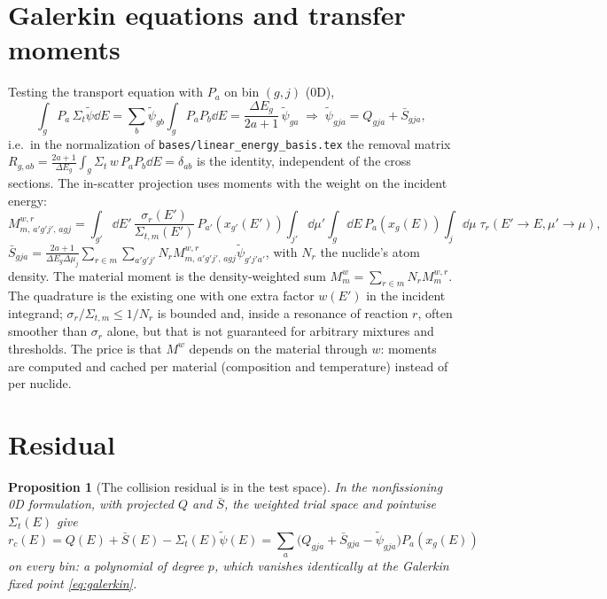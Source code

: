 \documentclass[11pt]{article}
\newtheorem{proposition}{Proposition}
\newcommand{\tpsi}{\tilde\psi}
\newcommand{\Sbar}{\bar S}
\newcommand{\Sigt}{\Sigma_t}
\begin{document}
\section{Galerkin equations and transfer moments}

Testing the transport equation with $P_a$ on bin $(g,j)$ (0D),
\begin{equation}
  \int_g P_a\,\Sigt\tpsi\dd E = \sum_b\tpsi_{gb}\int_g P_aP_b\dd E
  = \frac{\Delta E_g}{2a+1}\,\tpsi_{ga}
  \;\Longrightarrow\;
  \tpsi_{gja} = Q_{gja} + \Sbar_{gja},
  \label{eq:galerkin}
\end{equation}
i.e.\ in the normalization of \texttt{bases/linear\_energy\_basis.tex} the removal matrix
$R_{g,ab} = \frac{2a+1}{\Delta E_g}\int_g \Sigt\,w\,P_aP_b\dd E = \delta_{ab}$ is the
identity, independent of the cross sections. The in-scatter projection uses moments
with the weight on the incident energy:
\begin{equation}
  M^{w,r}_{m,\,a'g'j',\,agj} = \int_{g'}\!\dd E'\,
  \frac{\sigma_r(E')}{\Sigma_{t,m}(E')}\,P_{a'}(x_{g'}(E'))
  \int_{j'}\!\dd\mu'\int_g\!\dd E\,P_a(x_g(E))\int_j\!\dd\mu\;
  \tau_r(E'\!\to E,\mu'\!\to\mu),
\end{equation}
$\Sbar_{gja} = \frac{2a+1}{\Delta E_g\Delta\mu_j}
\sum_{r\in m}\sum_{a'g'j'}N_rM^{w,r}_{m,\,a'g'j',\,agj}\tpsi_{g'j'a'}$,
with $N_r$ the nuclide's atom density. The material moment is the density-weighted
sum $M^w_m=\sum_{r\in m}N_rM^{w,r}_m$. The quadrature is
the existing one with one extra factor $w(E')$ in the incident integrand;
$\sigma_r/\Sigma_{t,m}\le 1/N_r$ is bounded and, inside a resonance of reaction $r$,
often smoother than $\sigma_r$ alone, but that is not guaranteed for arbitrary
mixtures and thresholds. The price is that $M^w$ depends on the material through
$w$: moments are computed and cached per material (composition and temperature) instead
of per nuclide.

\section{Residual}

\begin{proposition}[The collision residual is in the test space]
In the nonfissioning 0D formulation, with projected $Q$ and $\Sbar$, the weighted
trial space and pointwise $\Sigt(E)$ give
\[
  r_c(E) = Q(E) + \Sbar(E) - \Sigt(E)\tpsi(E)
  = \sum_a\big(Q_{gja} + \Sbar_{gja} - \tpsi_{gja}\big)P_a(x_g(E))
\]
on every bin: a polynomial of degree $p$, which vanishes identically at the Galerkin
fixed point \eqref{eq:galerkin}.
\end{proposition}
\end{document}
